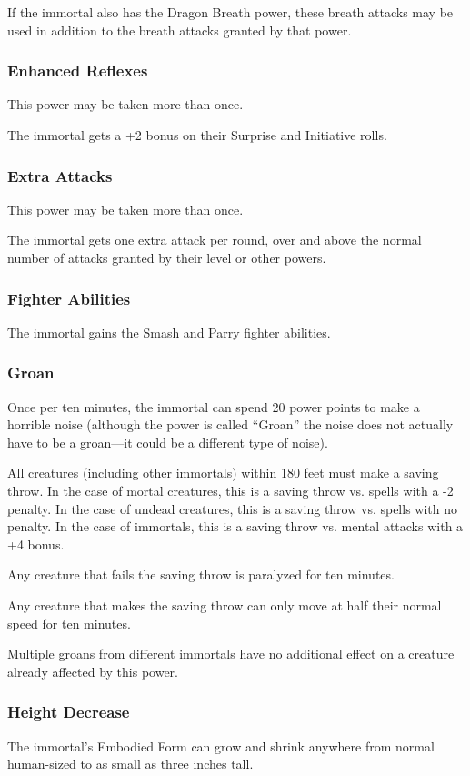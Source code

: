 \begin{multicols*}{2}
If the immortal also has the Dragon Breath power, these breath attacks may be used in addition to the breath attacks granted by that power.

\subsubsection{Enhanced Reflexes}
This power may be taken more than once.

The immortal gets a +2 bonus on their Surprise and Initiative rolls.

\subsubsection{Extra Attacks}
This power may be taken more than once.

The immortal gets one extra attack per round, over and above the normal number of attacks granted by their level or other powers.

\subsubsection{Fighter Abilities}
The immortal gains the Smash and Parry fighter abilities.

\subsubsection{Groan}
Once per ten minutes, the immortal can spend 20 power points to make a horrible noise (although the power is called “Groan” the noise does not actually have to be a groan—it could be a different type of noise).

All creatures (including other immortals) within 180 feet must make a saving throw. In the case of mortal creatures, this is a saving throw vs. spells with a -2 penalty. In the case of undead creatures, this is a saving throw vs. spells with no penalty. In the case of immortals, this is a saving throw vs. mental attacks with a +4 bonus.

Any creature that fails the saving throw is paralyzed for ten minutes.

Any creature that makes the saving throw can only move at half their normal speed for ten minutes.

Multiple groans from different immortals have no additional effect on a creature already affected by this power.

\subsubsection{Height Decrease}
The immortal’s Embodied Form can grow and shrink anywhere from normal human-sized to as small as three inches tall.


\end{multicols*}
